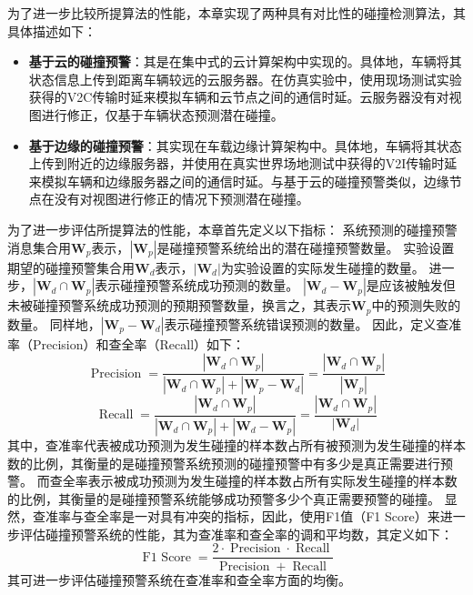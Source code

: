 为了进一步比较所提算法的性能，本章实现了两种具有对比性的碰撞检测算法，其具体描述如下：
\begin{itemize}
	\item \textbf{基于云的碰撞预警}：其是在集中式的云计算架构中实现的。具体地，车辆将其状态信息上传到距离车辆较远的云服务器。在仿真实验中，使用现场测试实验获得的V2C传输时延来模拟车辆和云节点之间的通信时延。云服务器没有对视图进行修正，仅基于车辆状态预测潜在碰撞。
	\item \textbf{基于边缘的碰撞预警}：其实现在车载边缘计算架构中。具体地，车辆将其状态上传到附近的边缘服务器，并使用在真实世界场地测试中获得的V2I传输时延来模拟车辆和边缘服务器之间的通信时延。与基于云的碰撞预警类似，边缘节点在没有对视图进行修正的情况下预测潜在碰撞。
\end{itemize}

为了进一步评估所提算法的性能，本章首先定义以下指标：
系统预测的碰撞预警消息集合用$\mathbf{W}_{p}$表示，$\left| \mathbf{W}_{p} \right|$是碰撞预警系统给出的潜在碰撞预警数量。
实验设置期望的碰撞预警集合用$\mathbf{W}_{d}$表示，$\left| \mathbf{W}_{d} \right|$为实验设置的实际发生碰撞的数量。
进一步，$\left| \mathbf{W}_{d} \cap \mathbf{W}_{p} \right|$表示碰撞预警系统成功预测的数量。
$\left| \mathbf{W}_{d} - \mathbf{W}_{p} \right|$是应该被触发但未被碰撞预警系统成功预测的预期预警数量，换言之，其表示$\mathbf{W}_{p}$中的预测失败的数量。
同样地，$\left| {\mathbf{W}_{p} - \mathbf{W}_{d}} \right|$表示碰撞预警系统错误预测的数量。
因此，定义查准率（Precision）和查全率（Recall）如下：
\begin{equation}
	\operatorname{Precision} = \frac{{\left| {\mathbf{W}_{d} \cap \mathbf{W}_{p}} \right|}}{{\left| {\mathbf{W}_{d} \cap \mathbf{W}_{p}} \right| + \left| {\mathbf{W}_{p} - \mathbf{W}_{d}} \right|}} = \frac{{\left| {\mathbf{W}_{d} \cap \mathbf{W}_{p}} \right|}}{\left| \mathbf{W}_{p} \right|}
\end{equation}
\begin{equation}
	\operatorname{Recall} = \frac{{\left| {\mathbf{W}_{d} \cap \mathbf{W}_{p}} \right|}}{{\left| {\mathbf{W}_{d} \cap \mathbf{W}_{p}} \right| + \left| {\mathbf{W}_{d} - \mathbf{W}_{p}} \right|}} = \frac{{\left| {\mathbf{W}_{d} \cap \mathbf{W}_{p}} \right|}}{\left| \mathbf{W}_{d} \right|} 
\end{equation}
其中，查准率代表被成功预测为发生碰撞的样本数占所有被预测为发生碰撞的样本数的比例，其衡量的是碰撞预警系统预测的碰撞预警中有多少是真正需要进行预警。
而查全率表示被成功预测为发生碰撞的样本数占所有实际发生碰撞的样本数的比例，其衡量的是碰撞预警系统能够成功预警多少个真正需要预警的碰撞。
显然，查准率与查全率是一对具有冲突的指标，因此，使用F1值（F1 Score）来进一步评估碰撞预警系统的性能，其为查准率和查全率的调和平均数，其定义如下：
\begin{equation}
	\operatorname{F1\ Score} = \frac{2 \cdot \operatorname{Precision} \cdot \operatorname{Recall}}{\operatorname{Precision} + \operatorname{Recall}} 
\end{equation}
其可进一步评估碰撞预警系统在查准率和查全率方面的均衡。

